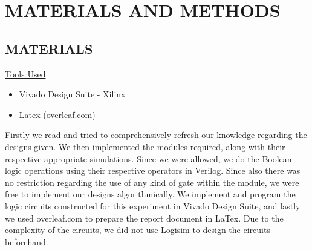 \documentclass[pdftex,12pt,a4paper]{article}
\begin{document}
\section{MATERIALS AND METHODS}

\subsection{MATERIALS}
\underline{Tools Used}
\begin{itemize}
    \item {Vivado Design Suite - Xilinx}
    \item{Latex (overleaf.com)}
\end{itemize}
Firstly we read and tried to comprehensively refresh our knowledge regarding the designs given. We then implemented the modules required, along with their respective appropriate simulations. Since we were allowed, we do the Boolean logic operations using their respective operators in Verilog. Since also there was no restriction regarding the use of any kind of gate within the module, we were free to implement our designs algorithmically.  We implement and program the logic circuits constructed for this experiment in Vivado Design Suite, and lastly we used overleaf.com to prepare the report document in LaTex. Due to the complexity of the circuits, we did not use Logisim to design the circuits beforehand. 
\end{document}
